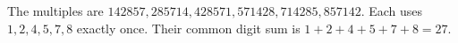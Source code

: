 The multiples are $142857,285714,428571,571428,714285,857142$. Each uses $1,2,4,5,7,8$ exactly once. Their common digit sum is $1+2+4+5+7+8=\boxed{27}$.

